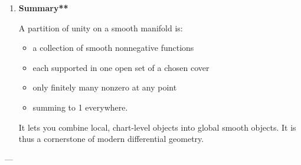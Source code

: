 \documentclass[10pt,a4paper]{report}
\begin{document}
\begin{enumerate}
\begin{enumerate}

\item  Defining Riemannian metrics globally**

Given local metrics $g_i$, let
$$
g = \sum_i \varphi_i g_i.
$$

\item  Integrating differential forms**

Used to reduce problems to computations in coordinate charts.

\item  Proving de Rham cohomology = Čech cohomology**

\item  Constructing global vector fields, tensor fields**

\item Embedding manifolds in Euclidean space**

(Used in the Whitney embedding theorem.)

\end{enumerate}
---

\item \textbf{Summary**}

A partition of unity on a smooth manifold is:
\begin{itemize}

\item a collection of smooth nonnegative functions
\item each supported in one open set of a chosen cover
\item only finitely many nonzero at any point
\item summing to 1 everywhere.

\end{itemize}
It lets you combine local, chart-level objects into global smooth objects.
It is thus a cornerstone of modern differential geometry.

\end{enumerate}
---
\end{document}
